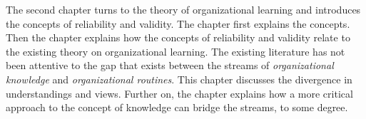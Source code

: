 
The second chapter turns to the theory of organizational learning and introduces the concepts of reliability and validity. The chapter first explains the concepts. Then the chapter explains how the concepts of reliability and validity relate to the existing theory on organizational learning. The existing literature has not been attentive to the gap that exists between the streams of \textit{organizational knowledge} and \textit{organizational routines}. This chapter discusses the divergence in understandings and views. Further on, the chapter explains how a more critical approach to the concept of knowledge can bridge the streams, to some degree.


